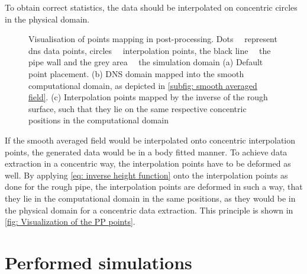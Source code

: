 To obtain correct statistics, the data should be interpolated on concentric circles in the physical domain.
\begin{figure}
    \centering
    \begin{subfigure}{0.325\textwidth}
        \subcaption{}
        
        \label{subfig: PP points at beginning}
    \end{subfigure}
    \hfill
    \begin{subfigure}{0.325\textwidth}
        \subcaption{}
        
        \label{subfig: PP points after mapping to smooth}
    \end{subfigure}
    \hfill
    \begin{subfigure}{0.325\textwidth}
        \subcaption{}
        
        \label{subfig: PP points after inverse maping}
    \end{subfigure}
    \plotverticalspacing
    \caption[Placement of data points and interpolation points while mapping in post-processing]{Visualisation of points mapping in post-processing. Dots \dnsdot~\ represent \acrshort{dns} data points, circles  \interpcircle~\ interpolation points, the  black line \wallline~\ the pipe wall and the grey area \domainsquare~\ the simulation domain (a) Default point placement. (b) DNS domain mapped into the smooth computational domain, as depicted in \autoref{subfig: smooth averaged field}. (c) Interpolation points mapped by the inverse of the rough surface, such that they lie on the same respective concentric positions in the computational domain}
    \label{fig: Visualization of the PP points}
\end{figure} 
If the smooth averaged field would be interpolated onto concentric interpolation points, the generated data would be in a body fitted manner.
To achieve data extraction in a concentric way, the interpolation points have to be deformed as well. 
By applying \autoref{eq: inverse height function} onto the interpolation points as done for the rough pipe, the interpolation points are deformed in such a way, that they lie in the computational domain in the same positions, as they would be in the physical domain for a concentric data extraction. This principle is shown in \autoref{fig: Visualization of the PP points}.

\section{Performed simulations}\label{sec: performed simulations}

